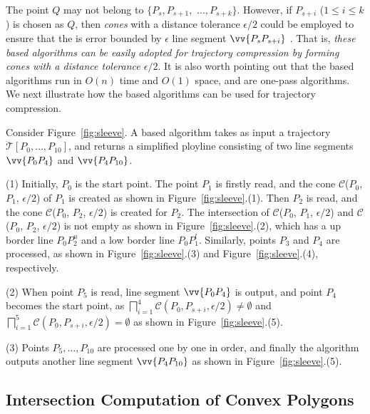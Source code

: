 The point $Q$ may not belong to $\{P_{s}, P_{s+1},$ $\ldots, P_{s+k}\}$.
However, if $P_{s+i}$ ($1\le i\le k$) is chosen as $Q$, then \emph{cones} with a distance tolerance $\epsilon/2$ could be employed to ensure that the \ped is error bounded by $\epsilon$ \wrt line segment $\vv{P_sP_{s+i}}$ \cite{Zhao:Sleeve}. That is, {\em these \cia based algorithms can be easily adopted for trajectory compression by forming cones with a distance tolerance $\epsilon/2$}.  It is also worth pointing out that the \cia based algorithms  run in $O(n)$ time and $O(1)$ space, and are one-pass algorithms.
%
We next illustrate how the \cia based algorithms can be used for trajectory compression.



\begin{example}
\label{exm-alg-sleeve}
Consider Figure~\ref{fig:sleeve}. A \cia based algorithm takes as input a trajectory $\dddot{\mathcal{T}}[P_0, \ldots, P_{10}]$, and returns a simplified ployline consisting of two line segments $\vv{P_0P_4}$ and  $\vv{P_4P_{10}}$.

\sstab(1) Initially, $P_0$ is the start point. The point $P_1$ is firstly read, and the cone $\mathcal{C}$($P_0$, $P_{1}$, $\epsilon/2$) of $P_1$ is created as shown in Figure~\ref{fig:sleeve}.(1).
Then $P_2$ is read, and the cone $\mathcal{C}$($P_0$, $P_{2}$, $\epsilon/2$) is created for $P_2$. The intersection of $\mathcal{C}$($P_0$, $P_{1}$, $\epsilon/2$) and $\mathcal{C}$($P_0$, $P_{2}$, $\epsilon/2$) is not empty as shown in Figure~\ref{fig:sleeve}.(2), which has a up border line $P_0P_2^u$ and a low border line $P_0P_1^l$.
%
Similarly, points $P_3$ and $P_4$ are processed, as shown in Figure~\ref{fig:sleeve}.(3) and Figure~\ref{fig:sleeve}.(4), respectively.

\sstab(2) When point $P_5$ is read,  line segment $\vv{P_0P_4}$ is output, and point $P_4$ becomes the start point, as $\bigsqcap_{i=1}^{4}\mathcal{C}(P_0, P_{s+i}, \epsilon/2) \ne \emptyset$ and $\bigsqcap_{i=1}^{5}\mathcal{C}(P_0, P_{s+i}, \epsilon/2) = \emptyset$ as shown in Figure~\ref{fig:sleeve}.(5).


\sstab(3) Points $P_5, \ldots, P_{10}$ are processed one by one in order, and finally the algorithm outputs another line segment $\vv{P_4P_{10}}$ as shown in Figure~\ref{fig:sleeve}.(5).
\end{example}




\subsection{Intersection Computation of Convex Polygons}

